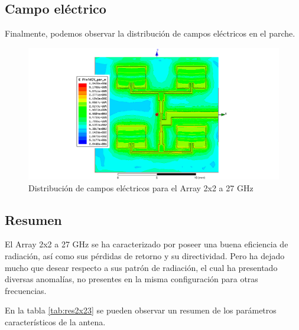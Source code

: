 \newpage
\subsection{Campo eléctrico}
\par Finalmente, podemos observar la distribución de campos eléctricos en el parche. 
\begin{figure}[H]
    \centering
        \includegraphics[width=\textwidth]{archivos/analisis/2x23/8}
        \caption{Distribución de campos eléctricos para el Array 2x2 a 27 GHz}
        \label{fig:elec2x23}
\end{figure}


\subsection{Resumen}
\par El Array 2x2 a 27 GHz se ha caracterizado por poseer una buena eficiencia de radiación, así como sus pérdidas de retorno y su directividad. Pero ha dejado mucho que desear respecto a sus patrón de radiación, el cual ha presentado diversas anomalías, no presentes en la misma configuración para otras frecuencias.
\\
\par En la tabla \ref{tab:res2x23} se pueden observar un resumen de los parámetros característicos de la antena.

